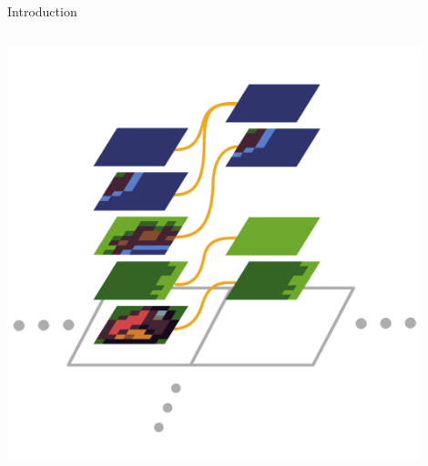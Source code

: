\documentclass{beamer}
\begin{document}
\begin{frame}[fragile]{Introduction}
\begin{columns}[T,onlytextwidth]
\begin{block}{}
          \includegraphics[width=0.9\textwidth]{figs/ac_illustration_consistent.pdf}
        \end{block}
    \end{columns}

  \end{frame}


%
%
%
%
\end{document}
